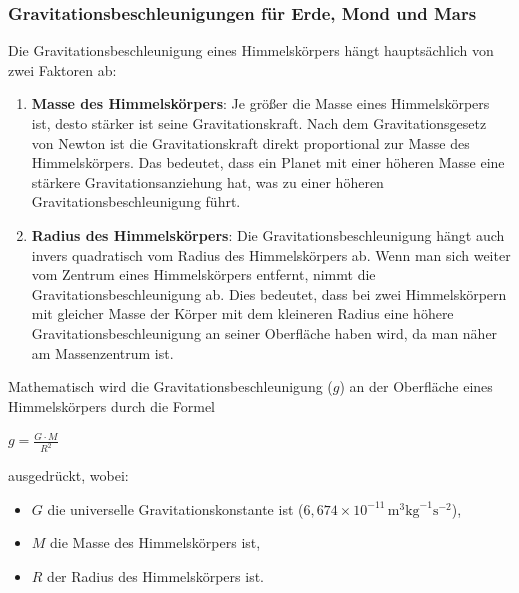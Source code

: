 \documentclass{vorlage-design-main}
\begin{document}
\hypertarget{gravitationsbeschleunigungen-fuxfcr-erde-mond-und-mars}{%
\subsubsection{Gravitationsbeschleunigungen für Erde, Mond und
Mars}\label{gravitationsbeschleunigungen-fuer-erde-mond-und-mars}}

Die Gravitationsbeschleunigung eines Himmelskörpers hängt hauptsächlich
von zwei Faktoren ab:

\begin{enumerate}
\def\labelenumi{\arabic{enumi}.}
\item
  \textbf{Masse des Himmelskörpers}: Je größer die Masse eines
  Himmelskörpers ist, desto stärker ist seine Gravitationskraft. Nach
  dem Gravitationsgesetz von Newton ist die Gravitationskraft direkt
  proportional zur Masse des Himmelskörpers. Das bedeutet, dass ein
  Planet mit einer höheren Masse eine stärkere Gravitationsanziehung
  hat, was zu einer höheren Gravitationsbeschleunigung führt.
\item
  \textbf{Radius des Himmelskörpers}: Die Gravitationsbeschleunigung
  hängt auch invers quadratisch vom Radius des Himmelskörpers ab. Wenn
  man sich weiter vom Zentrum eines Himmelskörpers entfernt, nimmt die
  Gravitationsbeschleunigung ab. Dies bedeutet, dass bei zwei
  Himmelskörpern mit gleicher Masse der Körper mit dem kleineren Radius
  eine höhere Gravitationsbeschleunigung an seiner Oberfläche haben
  wird, da man näher am Massenzentrum ist.
\end{enumerate}

Mathematisch wird die Gravitationsbeschleunigung ($g$) an der
Oberfläche eines Himmelskörpers durch die Formel

$g = \frac{G \cdot M}{R^2}$

ausgedrückt, wobei:

\begin{itemize}

\item
  $G$ die universelle Gravitationskonstante ist
  ($6,674 \times 10^{-11} \, \text{m}^3 \text{kg}^{-1} \text{s}^{-2}$),
\item
  $M$ die Masse des Himmelskörpers ist,
\item
  $R$ der Radius des Himmelskörpers ist.
\end{itemize}
\end{document}
